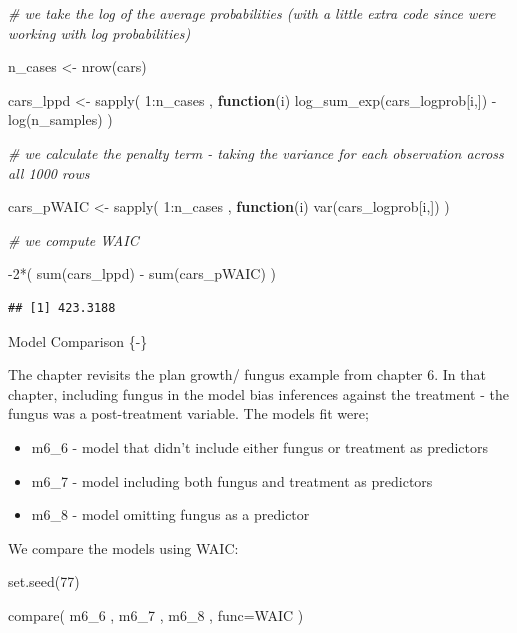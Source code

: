 \documentclass[
]{book}
\newenvironment{Shaded}{\begin{snugshade}}{\end{snugshade}}
\newcommand{\AttributeTok}[1]{\textcolor[rgb]{0.77,0.63,0.00}{#1}}
\newcommand{\CommentTok}[1]{\textcolor[rgb]{0.56,0.35,0.01}{\textit{#1}}}
\newcommand{\ControlFlowTok}[1]{\textcolor[rgb]{0.13,0.29,0.53}{\textbf{#1}}}
\newcommand{\DecValTok}[1]{\textcolor[rgb]{0.00,0.00,0.81}{#1}}
\newcommand{\FunctionTok}[1]{\textcolor[rgb]{0.00,0.00,0.00}{#1}}
\newcommand{\NormalTok}[1]{#1}
\newcommand{\OtherTok}[1]{\textcolor[rgb]{0.56,0.35,0.01}{#1}}
\newcommand{\SpecialCharTok}[1]{\textcolor[rgb]{0.00,0.00,0.00}{#1}}
\providecommand{\tightlist}{%
  \setlength{\itemsep}{0pt}\setlength{\parskip}{0pt}}
\begin{document}
\begin{Shaded}
\begin{Highlighting}[]
\CommentTok{\# we take the log of the average probabilities (with a little extra code since we\textquotesingle{}re working with log probabilities)}

\NormalTok{n\_cases }\OtherTok{\textless{}{-}} \FunctionTok{nrow}\NormalTok{(cars) }

\NormalTok{cars\_lppd }\OtherTok{\textless{}{-}} \FunctionTok{sapply}\NormalTok{( }\DecValTok{1}\SpecialCharTok{:}\NormalTok{n\_cases , }\ControlFlowTok{function}\NormalTok{(i) }\FunctionTok{log\_sum\_exp}\NormalTok{(cars\_logprob[i,]) }\SpecialCharTok{{-}} \FunctionTok{log}\NormalTok{(n\_samples) )}

\CommentTok{\# we calculate the penalty term {-} taking the variance for each observation across all 1000 rows}

\NormalTok{cars\_pWAIC }\OtherTok{\textless{}{-}} \FunctionTok{sapply}\NormalTok{( }\DecValTok{1}\SpecialCharTok{:}\NormalTok{n\_cases , }\ControlFlowTok{function}\NormalTok{(i) }\FunctionTok{var}\NormalTok{(cars\_logprob[i,]) )}

\CommentTok{\# we compute WAIC}

\SpecialCharTok{{-}}\DecValTok{2}\SpecialCharTok{*}\NormalTok{( }\FunctionTok{sum}\NormalTok{(cars\_lppd) }\SpecialCharTok{{-}} \FunctionTok{sum}\NormalTok{(cars\_pWAIC) )}
\end{Highlighting}
\end{Shaded}

\begin{verbatim}
## [1] 423.3188
\end{verbatim}

Model Comparison \{-\}

The chapter revisits the plan growth/ fungus example from chapter 6. In that chapter, including fungus in the model bias inferences against the treatment - the fungus was a post-treatment variable. The models fit were;

\begin{itemize}
\tightlist
\item
  m6\_6 - model that didn't include either fungus or treatment as predictors
\item
  m6\_7 - model including both fungus and treatment as predictors
\item
  m6\_8 - model omitting fungus as a predictor
\end{itemize}

We compare the models using WAIC:

\begin{Shaded}
\begin{Highlighting}[]
\FunctionTok{set.seed}\NormalTok{(}\DecValTok{77}\NormalTok{)}

\FunctionTok{compare}\NormalTok{( m6\_6 , m6\_7 , m6\_8 , }\AttributeTok{func=}\NormalTok{WAIC )}
\end{Highlighting}
\end{Shaded}
\end{document}
